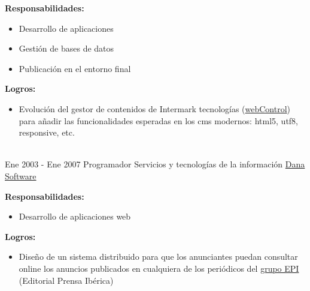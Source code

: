 \documentclass[letterpaper]{twentysecondcv} %
\begin{document}
\begin{twenty}
{		\textbf{Responsabilidades:}
		\begin{itemize}
			\item Desarrollo de aplicaciones
			\item Gestión de bases de datos
			\item Publicación en el entorno final
		\end{itemize}

		\textbf{Logros:}
		\begin{itemize}
			\item Evolución del gestor de contenidos de Intermark tecnologías (\href{http://www.webcontrol.es/es/}{webControl}) para añadir las funcionalidades esperadas en los cms modernos: html5, utf8, responsive, etc.
		\end{itemize}
	}
	\\
	\twentyitem
	{Ene 2003 -}
	{Ene 2007}
	{Programador}
	{Servicios y tecnologías de la información}
	{\href{http://www.danasoftware.com/}{Dana Software}}
	{

		\textbf{Responsabilidades:}
		\begin{itemize}
			\item Desarrollo de aplicaciones web
		\end{itemize}

		\textbf{Logros:}
		\begin{itemize}
			\item Diseño de un sistema distribuido para que los anunciantes puedan consultar online los anuncios publicados en cualquiera de los periódicos del \href{http://www.epi.es/}{grupo EPI} (Editorial Prensa Ibérica)
		\end{itemize}
	}

\end{twenty}
\end{document}
